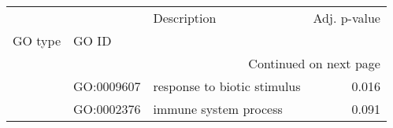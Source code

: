 \begin{longtable}{lllr}
\toprule
   &            &                  Description &  Adj. p-value \\
GO type & GO ID &                              &               \\
\midrule
\endhead
\midrule
\multicolumn{4}{r}{{Continued on next page}} \\
\midrule
\endfoot

\bottomrule
\endlastfoot
\multirow{2}{*}{BP} & GO:0009607 &  response to biotic stimulus &         0.016 \\
   & GO:0002376 &        immune system process &         0.091 \\
\end{longtable}
